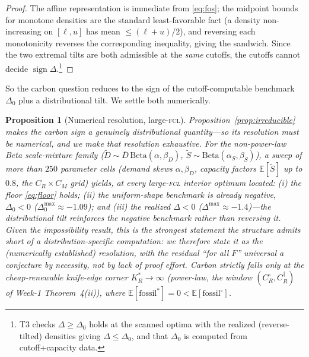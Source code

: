 \documentclass[11pt,reqno]{amsart}
\theoremstyle{plain}
\newtheorem{proposition}{Proposition}
\theoremstyle{definition}
\theoremstyle{remark}
\newcommand{\KRs}{K_R^{*}}
\newcommand{\Dbar}{\bar D}
\newcommand{\CM}{C_M}
\newcommand{\CR}{C_R}
\newcommand{\E}{\mathbb{E}}
\begin{document}
\begin{proof}
The affine representation is immediate from \eqref{eq:fos}; the midpoint bounds for
monotone densities are the standard least-favorable fact (a density non-increasing
on $[\ell,u]$ has mean $\le(\ell+u)/2$), and reversing each
monotonicity reverses the corresponding inequality, giving the sandwich. Since the
two extremal tilts are both admissible at the \emph{same} cutoffs, the cutoffs
cannot decide $\operatorname{sign}\Delta$.\footnote{T3 checks $\Delta\ge\Delta_0$
holds at the scanned optima with the realized (reverse-tilted) densities giving
$\Delta\le\Delta_0$, and that $\Delta_0$ is computed from cutoff+capacity data.}
\end{proof}

So the carbon question reduces to the sign of the cutoff-computable benchmark
$\Delta_0$ plus a distributional tilt. We settle both numerically.

\begin{proposition}[Numerical resolution, large-\textsc{fcl}]\label{prop:regimecarbon}
Proposition~\ref{prop:irreducible} makes the carbon sign a genuinely distributional
quantity---so its resolution \emph{must} be numerical, and we make that resolution
exhaustive. For the non-power-law Beta scale-mixture family
($\tilde D\sim\Dbar\,\mathrm{Beta}(\alpha,\beta_D)$,
$\tilde S\sim\mathrm{Beta}(\alpha_S,\beta_S)$), a sweep of
more than $250$ parameter cells (demand skews $\alpha,\beta_D$, capacity factors
$\E[\tilde S]$ up to $0.8$, the $\CR\times\CM$ grid) yields, at \emph{every}
large-\textsc{fcl} interior optimum located: \textup{(i)}
the floor \eqref{eq:floor} holds; \textup{(ii)} the uniform-shape benchmark is
already negative, $\Delta_0<0$ ($\Delta_0^{\max}\approx-1.09$); and \textup{(iii)}
the realized $\Delta<0$ ($\Delta^{\max}\approx-1.4$)---the distributional tilt
\emph{reinforces} the negative benchmark rather than reversing it. Given the
impossibility result, this is the strongest statement the structure admits short of
a distribution-specific computation: we therefore state it as the
\emph{(numerically established)} resolution, with the residual ``for all $F$''
universal a conjecture by necessity, not by lack of proof effort. Carbon
strictly falls only at the cheap-renewable knife-edge \emph{corner} $\KRs\to\infty$
(power-law, the window $(\CR^{\circ},\CR^{\dagger})$ of Week-1 Theorem~4(ii)), where
$\E[\text{fossil}^{*}]=0<\E[\text{fossil}^{\circ}]$.
\end{proposition}
\end{document}
